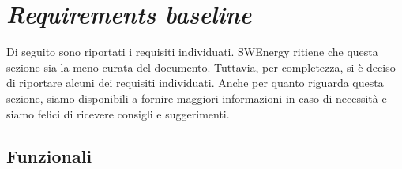 \section{\textit{Requirements baseline}}

Di seguito sono riportati i requisiti individuati. SWEnergy ritiene che questa
sezione sia la meno curata del documento. Tuttavia, per completezza, si è
deciso di riportare alcuni dei requisiti individuati. Anche per quanto riguarda
questa sezione, siamo disponibili a fornire maggiori informazioni in caso di
necessità e siamo felici di ricevere consigli e suggerimenti.

\subsection{Funzionali}

